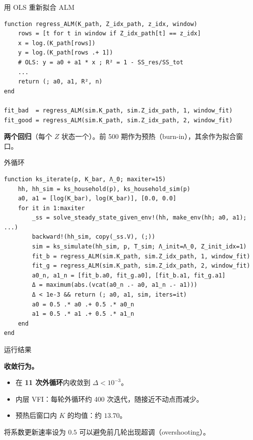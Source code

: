 \documentclass[10pt,aspectratio=169]{beamer}
\begin{document}
\begin{frame}[fragile]{用 OLS 重新拟合 ALM}
\begin{lstlisting}
function regress_ALM(K_path, Z_idx_path, z_idx, window)
    rows = [t for t in window if Z_idx_path[t] == z_idx]
    x = log.(K_path[rows])
    y = log.(K_path[rows .+ 1])
    # OLS: y = a0 + a1 * x ; R² = 1 - SS_res/SS_tot
    ...
    return (; a0, a1, R², n)
end

fit_bad  = regress_ALM(sim.K_path, sim.Z_idx_path, 1, window_fit)
fit_good = regress_ALM(sim.K_path, sim.Z_idx_path, 2, window_fit)
\end{lstlisting}

\textbf{两个回归}（每个 $Z$ 状态一个）。前 500 期作为预热（burn-in），其余作为拟合窗口。

\end{frame}

\begin{frame}[fragile]{外循环}
\begin{lstlisting}
function ks_iterate(p, K_bar, Λ_0; maxiter=15)
    hh, hh_sim = ks_household(p), ks_household_sim(p)
    a0, a1 = [log(K_bar), log(K_bar)], [0.0, 0.0]
    for it in 1:maxiter
        _ss = solve_steady_state_given_env!(hh, make_env(hh; a0, a1); ...)
        backward!(hh_sim, copy(_ss.V), (;))
        sim = ks_simulate(hh_sim, p, T_sim; Λ_init=Λ_0, Z_init_idx=1)
        fit_b = regress_ALM(sim.K_path, sim.Z_idx_path, 1, window_fit)
        fit_g = regress_ALM(sim.K_path, sim.Z_idx_path, 2, window_fit)
        a0_n, a1_n = [fit_b.a0, fit_g.a0], [fit_b.a1, fit_g.a1]
        Δ = maximum(abs.(vcat(a0_n .- a0, a1_n .- a1)))
        Δ < 1e-3 && return (; a0, a1, sim, iters=it)
        a0 = 0.5 .* a0 .+ 0.5 .* a0_n
        a1 = 0.5 .* a1 .+ 0.5 .* a1_n
    end
end
\end{lstlisting}
\end{frame}

\begin{frame}{运行结果}

\textbf{收敛行为。}

\begin{itemize}
  \item 在 \textbf{11 次外循环}内收敛到 $\Delta < 10^{-3}$。
  \item 内层 VFI：每轮外循环约 400 次迭代，随接近不动点而减少。
  \item 预热后窗口内 $K$ 的均值：约 $13.70$。
\end{itemize}

\smallskip

将系数更新速率设为 $0.5$ 可以避免前几轮出现超调（overshooting）。

\end{frame}
\end{document}
